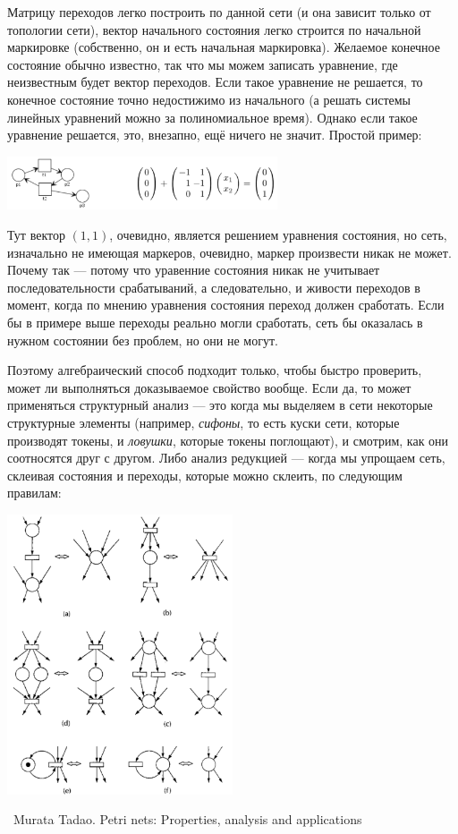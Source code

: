 \documentclass[a5paper]{article}
\newcommand{\attribution}[1] {
    \vspace{-5mm}\begin{flushright}\begin{scriptsize}%
    {\textcopyright\, #1}\end{scriptsize}\end{flushright}
}
\begin{document}
Матрицу переходов легко построить по данной сети (и она зависит только от топологии сети), вектор начального состояния легко строится по начальной маркировке (собственно, он и есть начальная маркировка). Желаемое конечное состояние обычно известно, так что мы можем записать уравнение, где неизвестным будет вектор переходов. Если такое уравнение не решается, то конечное состояние точно недостижимо из начального (а решать системы линейных уравнений можно за полиномиальное время). Однако если такое уравнение решается, это, внезапно, ещё ничего не значит. Простой пример:

\begin{center}
    \includegraphics[width=0.6\textwidth]{algebraicAnalysisFail.png}
\end{center}

Тут вектор $(1, 1)$, очевидно, является решением уравнения состояния, но сеть, изначально не имеющая маркеров, очевидно, маркер произвести никак не может. Почему так --- потому что уравенние состояния никак не учитывает последовательности срабатываний, а следовательно, и живости переходов в момент, когда по мнению уравнения состояния переход должен сработать. Если бы в примере выше переходы реально могли сработать, сеть бы оказалась в нужном состоянии без проблем, но они не могут.

Поэтому алгебраический способ подходит только, чтобы быстро проверить, может ли выполняться доказываемое свойство вообще. Если да, то может применяться структурный анализ --- это когда мы выделяем в сети некоторые структурные элементы (например, \textit{сифоны}, то есть куски сети, которые производят токены, и \textit{ловушки}, которые токены поглощают), и смотрим, как они соотносятся друг с другом. Либо анализ редукцией --- когда мы упрощаем сеть, склеивая состояния и переходы, которые можно склеить, по следующим правилам:

\begin{center}
    \includegraphics[width=0.5\textwidth]{petriReduction.png}
    \attribution{Murata Tadao. Petri nets: Properties, analysis and applications}
\end{center}
\end{document}
